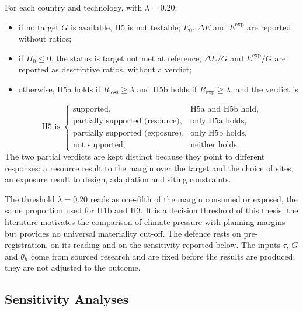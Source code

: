 For each country and technology, with $\lambda=0.20$:
\begin{itemize}
    \item if no target $G$ is available, H5 is not testable; $E_0$, $\Delta E$ and
    $E^{\mathrm{exp}}$ are reported without ratios;
    \item if $H_0\leq0$, the status is target not met at reference; $\Delta E/G$
    and $E^{\mathrm{exp}}/G$ are reported as descriptive ratios, without a
    verdict;
    \item otherwise, H5a holds if $R_{\mathrm{loss}}\geq\lambda$ and H5b holds if
    $R_{\mathrm{exp}}\geq\lambda$, and the verdict is
\end{itemize}
\begin{equation}
    \text{H5 is}\;
    \begin{cases}
        \text{supported}, & \text{H5a and H5b hold},\\
        \text{partially supported (resource)}, & \text{only H5a holds},\\
        \text{partially supported (exposure)}, & \text{only H5b holds},\\
        \text{not supported}, & \text{neither holds}.
    \end{cases}
    \label{eq:h5_verdict}
\end{equation}
The two partial verdicts are kept distinct because they point to different
responses: a resource result to the margin over the target and the choice of
sites, an exposure result to design, adaptation and siting constraints.

The threshold $\lambda=0.20$ reads as one-fifth of the margin consumed or exposed,
the same proportion used for H1b and H3. It is a decision threshold of this
thesis; the literature motivates the comparison of climate pressure with planning
margins but provides no universal materiality cut-off. The defence rests on
pre-registration, on its reading and on the sensitivity reported below. The
inputs $\tau$, $G$ and $\theta_h$ come from sourced research and are fixed before
the results are produced; they are not adjusted to the outcome.

\subsection{Sensitivity Analyses}
\label{subsec:h5_sensitivity}

